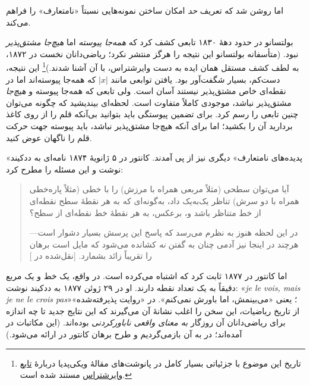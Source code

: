 \documentclass[../../../include/open-logic-section]{subfiles}
\begin{document}

اما روشن شد که تعریف \emph{حد} امکان ساختن نمونه‌هایی نسبتاً «نامتعارف»
را فراهم می‌کند.

بولتسانو در حدود دههٔ ۱۸۳۰ تابعی کشف کرد که \emph{همه‌جا پیوسته} اما
\emph{هیچ‌جا مشتق‌پذیر} نبود. (متأسفانه بولتسانو این نتیجه را هرگز منتشر
نکرد؛ ریاضی‌دانان نخست در ۱۸۷۲، به لطف کشف مستقل همان ایده به دست
وایرشتراس، با آن آشنا شدند.)\footnote{تاریخ این موضوع با جزئیاتی بسیار
کامل در پانوشت‌های مقالهٔ ویکی‌پدیا دربارهٔ
\href{http://en.wikipedia.org/wiki/Weierstrass_function}{تابع
وایرشتراس} مستند شده است.} این نتیجه، دست‌کم، بسیار شگفت‌آور بود. یافتن
توابعی مانند $|x|$ که همه‌جا پیوسته‌اند اما در نقطه‌ای خاص مشتق‌پذیر
نیستند آسان است. ولی تابعی که همه‌جا پیوسته و \emph{هیچ‌جا} مشتق‌پذیر
نباشد، موجودی کاملاً متفاوت است. لحظه‌ای بیندیشید که چگونه می‌توان چنین
تابعی را رسم کرد. برای تضمین پیوستگی باید بتوانید بی‌آنکه قلم را از روی
کاغذ بردارید آن را بکشید؛ اما برای آنکه هیچ‌جا مشتق‌پذیر نباشد، باید
پیوسته جهت حرکت قلم را ناگهان عوض کنید.

«پدیده‌های نامتعارف» دیگری نیز از پی آمدند. کانتور در ۵ ژانویهٔ ۱۸۷۴
نامه‌ای به ددکیند نوشت و این مسئله را مطرح کرد:
\begin{quote}
آیا می‌توان سطحی (مثلاً مربعی همراه با مرزش) را با خطی (مثلاً پاره‌خطی
همراه با دو سرش) تناظر یک‌به‌یک داد، به‌گونه‌ای که به هر نقطهٔ سطح نقطه‌ای
از خط متناظر باشد و، برعکس، به هر نقطهٔ خط نقطه‌ای از سطح؟

در این لحظه هنوز به نظرم می‌رسد که پاسخ این پرسش بسیار دشوار است---هرچند
در اینجا نیز آدمی چنان به گفتن \emph{نه} کشانده می‌شود که مایل است برهان
را تقریباً زائد بشمارد. [نقل‌شده در \citealt{Gouvea2011}]
\end{quote}
اما کانتور در ۱۸۷۷ ثابت کرد که اشتباه می‌کرده است. در واقع، یک خط و یک
مربع دقیقاً به یک تعداد نقطه دارند. او در ۲۹ ژوئن ۱۸۷۷ به ددکیند نوشت:
«\emph{je le vois, mais je ne le crois pas}»؛ یعنی «می‌بینمش، اما باورش
نمی‌کنم». در «روایت پذیرفته‌شده» از تاریخ ریاضیات، این سخن را اغلب نشانهٔ
آن می‌گیرند که این نتایج جدید تا چه اندازه برای ریاضی‌دانان آن روزگار
\emph{به معنای واقعی ناباورکردنی} بوده‌اند. (این مکاتبات در
\citet{Gouvea2011} آمده‌اند؛ در  به آن
بازمی‌گردیم و طرح برهان کانتور در 
ارائه می‌شود.)
\end{document}
